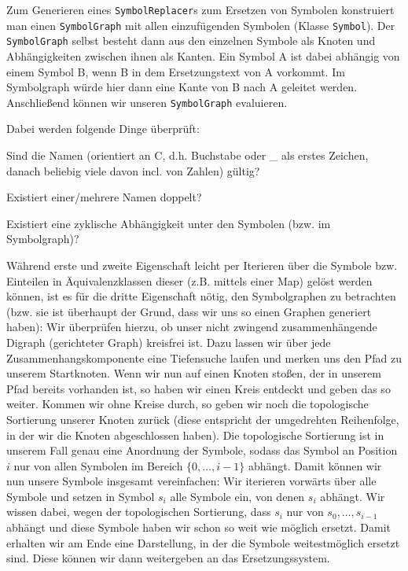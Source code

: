 Zum Generieren eines \texttt{SymbolReplacer}s zum Ersetzen von Symbolen
konstruiert man einen \texttt{SymbolGraph} mit allen einzufügenden Symbolen
(Klasse \texttt{Symbol}). Der \texttt{SymbolGraph} selbst besteht dann aus den
einzelnen Symbole als Knoten und Abhängigkeiten zwischen ihnen als Kanten. Ein
Symbol A ist dabei abhängig von einem Symbol B, wenn B in dem Ersetzungstext von
A vorkommt. Im Symbolgraph würde hier dann eine Kante von B nach A geleitet
werden. Anschließend können wir unseren \texttt{SymbolGraph} evaluieren.

Dabei werden folgende Dinge überprüft:
\begin{sitemize}{-0.4cm}
  \item Sind die Namen (orientiert an C, d.h. Buchstabe oder \_ als erstes
  Zeichen, danach beliebig viele davon incl. von Zahlen) gültig?
  \item Existiert einer/mehrere Namen doppelt?
  \item Existiert eine zyklische Abhängigkeit unter den Symbolen (bzw. im
  Symbolgraph)?
\end{sitemize}
\vspace{-0.4cm}

Während erste und zweite Eigenschaft leicht per Iterieren über die Symbole bzw.
Einteilen in Äquivalenzklassen dieser (z.B. mittels einer Map) gelöst werden
können, ist es für die dritte Eigenschaft nötig, den Symbolgraphen zu betrachten
(bzw. sie ist überhaupt der Grund, dass wir uns so einen Graphen generiert
haben): Wir überprüfen hierzu, ob unser nicht zwingend zusammenhängende Digraph
(gerichteter Graph) kreisfrei ist. Dazu lassen wir über jede
Zusammenhangskomponente eine Tiefensuche laufen und merken uns den Pfad zu
unserem Startknoten. Wenn wir nun auf einen Knoten stoßen, der in unserem Pfad
bereits vorhanden ist, so haben wir einen Kreis entdeckt und geben das so
weiter. Kommen wir ohne Kreise durch, so geben wir noch die topologische
Sortierung unserer Knoten zurück (diese entspricht der umgedrehten Reihenfolge,
in der wir die Knoten abgeschlossen haben). Die topologische Sortierung ist in
unserem Fall genau eine Anordnung der Symbole, sodass das Symbol an Position $i$
nur von allen Symbolen im Bereich $\{0,\dots,i-1\}$ abhängt. Damit können wir
nun unsere Symbole insgesamt vereinfachen: Wir iterieren vorwärts über alle
Symbole und setzen in Symbol $s_i$ alle Symbole ein, von denen $s_i$ abhängt.
Wir wissen dabei, wegen der topologischen Sortierung, dass $s_i$ nur von
$s_0,\dots,s_{i-1}$ abhängt und diese Symbole haben wir schon so weit wie
möglich ersetzt. Damit erhalten wir am Ende eine Darstellung, in der die Symbole
weitestmöglich ersetzt sind. Diese können wir dann weitergeben an das
Ersetzungssystem.

